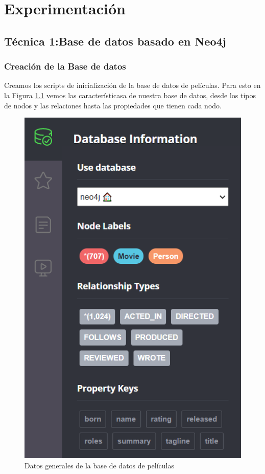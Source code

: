 \chapter{Experimentación }
\section{Técnica 1:Base de datos basado en Neo4j}
\subsection{Creación de la Base de datos}
Creamos los scripts de inicialización de la base de datos de películas.
Para esto en la Figura \ref{fig:info} vemos las característicasa de nuestra base de datos, desde los tipos de nodos y las relaciones hasta las propiedades que tienen cada nodo.
\begin{figure}[H]
    \centering
    \includegraphics[scale=0.45]{Graficos/info.png}
    \caption{Datos generales de la base de datos de películas}
    \label{fig:info}
\end{figure}
